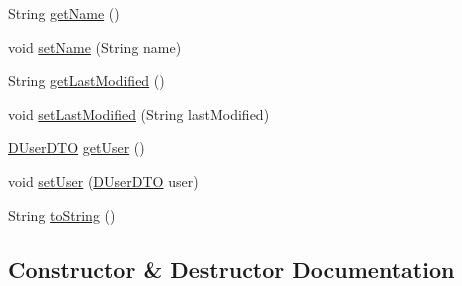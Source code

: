 \begin{DoxyCompactItemize}
\item 
String \mbox{\hyperlink{classes_1_1deusto_1_1bspq18_1_1e6_1_1_deusto_box_1_1_server_1_1dto_1_1_d_file_d_t_o_a696f8c18d8a51fff5f6597cbe32df81d}{get\+Name}} ()
\item 
void \mbox{\hyperlink{classes_1_1deusto_1_1bspq18_1_1e6_1_1_deusto_box_1_1_server_1_1dto_1_1_d_file_d_t_o_ad3adecb6cb3bdf7aafdafa4be534c410}{set\+Name}} (String name)
\item 
String \mbox{\hyperlink{classes_1_1deusto_1_1bspq18_1_1e6_1_1_deusto_box_1_1_server_1_1dto_1_1_d_file_d_t_o_aa7abe761df6aef240cabe0336818a3b8}{get\+Last\+Modified}} ()
\item 
void \mbox{\hyperlink{classes_1_1deusto_1_1bspq18_1_1e6_1_1_deusto_box_1_1_server_1_1dto_1_1_d_file_d_t_o_aabb4355cf53129e8f3ccbb3a2d94616a}{set\+Last\+Modified}} (String last\+Modified)
\item 
\mbox{\hyperlink{classes_1_1deusto_1_1bspq18_1_1e6_1_1_deusto_box_1_1_server_1_1dto_1_1_d_user_d_t_o}{D\+User\+D\+TO}} \mbox{\hyperlink{classes_1_1deusto_1_1bspq18_1_1e6_1_1_deusto_box_1_1_server_1_1dto_1_1_d_file_d_t_o_a0632e42191929410e498d86928106c0a}{get\+User}} ()
\item 
void \mbox{\hyperlink{classes_1_1deusto_1_1bspq18_1_1e6_1_1_deusto_box_1_1_server_1_1dto_1_1_d_file_d_t_o_a627a9ce6d49598b79cf81cb0e36f9f73}{set\+User}} (\mbox{\hyperlink{classes_1_1deusto_1_1bspq18_1_1e6_1_1_deusto_box_1_1_server_1_1dto_1_1_d_user_d_t_o}{D\+User\+D\+TO}} user)
\item 
String \mbox{\hyperlink{classes_1_1deusto_1_1bspq18_1_1e6_1_1_deusto_box_1_1_server_1_1dto_1_1_d_file_d_t_o_a0d7fbd7def53fa588a1591abce380a68}{to\+String}} ()
\end{DoxyCompactItemize}


\subsection{Constructor \& Destructor Documentation}
\mbox{\label{classes_1_1deusto_1_1bspq18_1_1e6_1_1_deusto_box_1_1_server_1_1dto_1_1_d_file_d_t_o_a19ac07787ead7e0fc9eb7576da30b92f}} 
